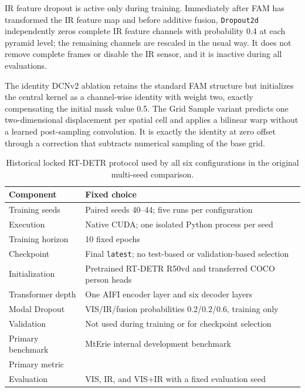 IR feature dropout is active only during training. Immediately after FAM has
transformed the IR feature map and before additive fusion, \texttt{Dropout2d}
independently zeros complete IR feature channels with probability 0.4 at each
pyramid level; the remaining channels are rescaled in the usual way. It does
not remove complete frames or disable the IR sensor, and it is inactive during
all evaluations.

The identity DCNv2 ablation retains the standard FAM structure but initializes
the central kernel as a channel-wise identity with weight two, exactly
compensating the initial mask value 0.5. The Grid Sample variant predicts one
two-dimensional displacement per spatial cell and applies a bilinear warp
without a learned post-sampling convolution. It is exactly the identity at
zero offset through a correction that subtracts numerical sampling of the base
grid.

\begin{table}[H]
  \centering
  \caption{Historical locked RT-DETR protocol used by all six
  configurations in the original multi-seed comparison.}
  \label{tab:rtdetr-protocol}
  \begin{tabularx}{\textwidth}{lX}
    \toprule
    Component & Fixed choice \\
    \midrule
    Training seeds & Paired seeds 40--44; five runs per configuration \\
    Execution & Native CUDA; one isolated Python process per seed \\
    Training horizon & 10 fixed epochs \\
    Checkpoint & Final \texttt{latest}; no test-based or validation-based selection \\
    Initialization & Pretrained RT-DETR R50vd and transferred COCO person heads \\
    Transformer depth & One AIFI encoder layer and six decoder layers \\
    Modal Dropout & VIS/IR/fusion probabilities 0.2/0.2/0.6, training only \\
    Validation & Not used during training or for checkpoint selection \\
    Primary benchmark & MtErie internal development benchmark \\
    Primary metric & \mapfifty{} \\
    Evaluation & VIS, IR, and VIS+IR with a fixed evaluation seed \\
    \bottomrule
  \end{tabularx}
\end{table}

